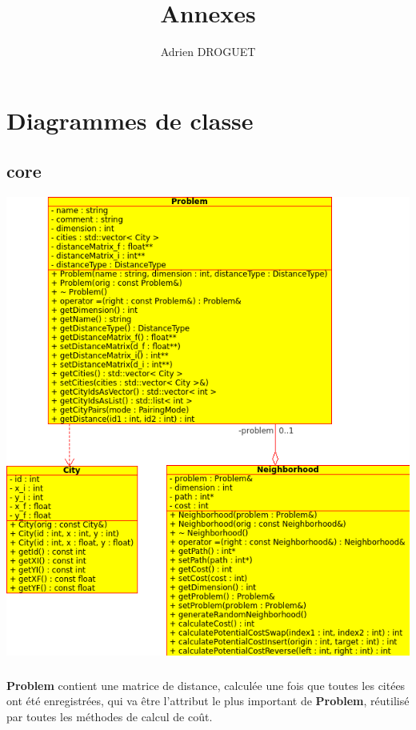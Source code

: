 \documentclass[a4paper,10pt]{report}
\title{Annexes}
\author{Adrien DROGUET}
\begin{document}
\maketitle

\tableofcontents
\pagebreak

\chapter{Diagrammes de classe}

\section{core}
\includegraphics[width=\textwidth]{../UML/core.png}

\paragraph{}
\textbf{Problem} contient une matrice de distance, calculée une fois que toutes
les citées ont été enregistrées, qui va être l'attribut le plus important de
\textbf{Problem}, réutilisé par toutes les méthodes de calcul de coût.
\end{document}
